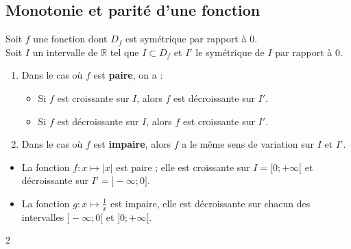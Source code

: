 







\subsection{Monotonie et parité d'une fonction }

\begin{Propriete}[][5 min]
Soit $f$ une fonction dont $D_f$ est symétrique par rapport à $0$. \\
Soit $I$ un intervalle de $\mathbb{R}$ tel que $I \subset D_f$ et $I'$ le symétrique de $I$ par rapport à $0$.
\begin{enumerate}
    \item[(1)] Dans le cas où $f$ est \textbf{paire}, on a :
    \begin{itemize}
        \item Si $f$ est croissante sur $I$, alors $f$ est décroissante sur $I'$.
        \item Si $f$ est décroissante sur $I$, alors $f$ est croissante sur $I'$.
    \end{itemize}
    \item[(2)] Dans le cas où $f$ est \textbf{impaire}, alors $f$ a le même sens de variation sur $I$ et $I'$.
\end{enumerate}
\end{Propriete}

\begin{Exemple}[][10 min]
\begin{itemize}
    \item La fonction $f : x \mapsto |x|$ est paire ; elle est croissante sur $I = [0 ; +\infty[$ et décroissante sur $I' = ]-\infty ; 0]$.
    \item La fonction $g : x \mapsto \frac{1}{x}$ est impaire, elle est décroissante sur chacun des intervalles $]-\infty ; 0[$ et $]0 ; +\infty[$.
\end{itemize}
\end{Exemple}


\begin{multicols}{2}



\columnbreak


    
\end{multicols}


